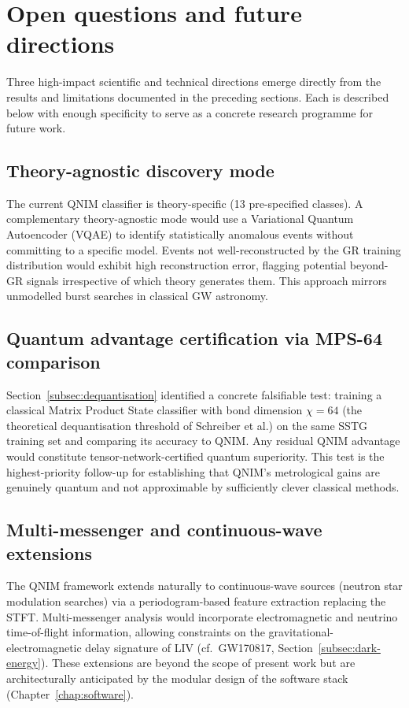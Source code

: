 \documentclass[11pt,a4paper, english]{book}
\theoremstyle{plain}
\theoremstyle{definition}
\numberwithin{equation}{chapter}
\numberwithin{figure}{chapter}
\numberwithin{table}{chapter}
\begin{document}
\section{Open questions and future directions}
\label{sec:disc-open-questions}

Three high-impact scientific and technical directions emerge directly from
the results and limitations documented in the preceding sections. Each is
described below with enough specificity to serve as a concrete research
programme for future work.

\subsection{Theory-agnostic discovery mode}
\label{subsec:disc-vqae}

The current QNIM classifier is theory-specific (13 pre-specified classes).
A complementary theory-agnostic mode would use a Variational Quantum
Autoencoder (VQAE) to identify statistically anomalous events without
committing to a specific model. Events not well-reconstructed by the
GR training distribution would exhibit high reconstruction error,
flagging potential beyond-GR signals irrespective of which theory
generates them.  This approach mirrors unmodelled burst searches in
classical GW astronomy.

\subsection{Quantum advantage certification via MPS-64 comparison}
\label{subsec:disc-mps64}

Section~\ref{subsec:dequantisation} identified a concrete falsifiable test:
training a classical Matrix Product State classifier with bond dimension
$\chi = 64$ (the theoretical dequantisation threshold of Schreiber et al.)
on the same SSTG training set and comparing its accuracy to QNIM.  Any
residual QNIM advantage would constitute tensor-network-certified quantum
superiority.  This test is the highest-priority follow-up for establishing
that QNIM's metrological gains are genuinely quantum and not
approximable by sufficiently clever classical methods.

\subsection{Multi-messenger and continuous-wave extensions}
\label{subsec:disc-multimessenger}

The QNIM framework extends naturally to continuous-wave sources (neutron
star modulation searches) via a periodogram-based feature extraction
replacing the STFT.  Multi-messenger analysis would incorporate
electromagnetic and neutrino time-of-flight information, allowing
constraints on the gravitational-electromagnetic delay signature of LIV
(cf.\ GW170817, Section~\ref{subsec:dark-energy}).  These extensions
are beyond the scope of present work but are architecturally anticipated
by the modular design of the software stack (Chapter~\ref{chap:software}).
\end{document}
